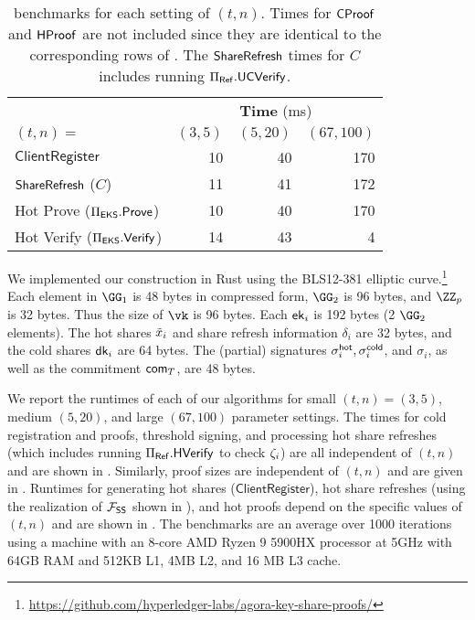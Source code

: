 \begin{table}[tb]
    \centering
    \begin{tabular}{l rrr}
        \toprule
        & \multicolumn{3}{c}{\textbf{Time} (ms)} \\
        $(t,n)=$                  & $(3,5)$ & $(5,20)$ & $(67,100)$ \\\midrule
        $\mathsf{ClientRegister}$ & 10      & 40       & 170 \\
        $\mathsf{ShareRefresh}$ ($C$)            & 11      & 41       & 172 \\
        Hot Prove ($\Pi_{\sf EKS}.\mathsf{Prove}$) & 10 & 40 & 170 \\
        Hot Verify ($\Pi_{\sf EKS}.\mathsf{Verify}$) & 14 & 43 & 4     \\\bottomrule
    \end{tabular}
    \caption{\sysname benchmarks for each setting of $(t,n)$. Times for $\mathsf{CProof}$ and $\mathsf{HProof}$ are not included since they are identical to the corresponding rows of . The $\mathsf{ShareRefresh}$ times for $C$ includes running $\Pi_{\sf Ref}.{\sf UC}\mathsf{Verify}$. }
    \label{tab:thresh_bench}
\end{table}

We implemented our construction in Rust using the BLS12-381 elliptic curve.\footnote{\url{https://github.com/hyperledger-labs/agora-key-share-proofs/}}
Each element in $\GG_1$ is 48 bytes in compressed form, $\GG_2$ is 96 bytes, and $\ZZ_p$ is 32 bytes. Thus the size of $\vk$ is 96 bytes. Each $\mathsf{ek}_i$ is 192 bytes (2 $\GG_2$ elements). The hot shares $\tilde{x}_i$ and share refresh information $\delta_i$ are 32 bytes, and the cold shares $\mathsf{dk}_i$ are 64 bytes. The (partial) signatures $\sigma_i^{\mathsf{hot}}, \sigma_i^{\mathsf{cold}}$, and $\sigma_i$, as well as the commitment $\mathsf{com}_{T}$, are 48 bytes. %

We report the runtimes of each of our algorithms for small $(t,n)=(3,5)$, %
medium $(5,20)$, %
and large $(67,100)$ parameter settings. %
The times for cold registration and proofs, threshold signing, and processing hot share refreshes (which includes running $\Pi_{\sf Ref}.{\sf H}\mathsf{Verify}$ to check $\zeta_i$) are all independent of $(t,n)$ and are shown in . Similarly, proof sizes are independent of $(t,n)$ and are given in . Runtimes for generating hot shares ($\mathsf{ClientRegister}$), hot share refreshes (using the realization of $\mathcal{F}_\mathsf{SS}$ shown in ), and hot proofs depend on the specific values of $(t,n)$ and are shown in .
The benchmarks are an average over 1000 iterations using a machine with an 8-core AMD Ryzen 9 5900HX processor at 5GHz with 64GB RAM and 512KB L1, 4MB L2, and 16 MB L3 cache.